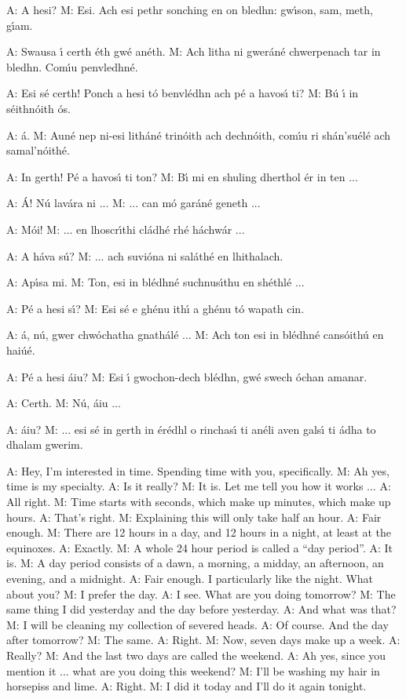 A: A hesi?
M: Esi. Ach esi pethr sonching en on bledhn: gw\'{\i}son, sam, meth, g\'{\i}am.

A: Swausa \'{\i} certh \'{e}th gw\'{e} an\'{e}th.
M: Ach litha ni gwer\'{a}n\'{e} chwerpenach tar in bledhn. Com\'{\i}u penvledhn\'{e}.

A: Esi s\'{e} certh! Ponch a hesi t\'{o} benvl\'{e}dhn ach p\'{e} a havos\'{\i} ti?
M: B\'{u} \'{\i} in s\'{e}ithn\'{o}ith \'{o}s.

A: \'{a}.
M: Aun\'{e} nep ni-esi lith\'{a}n\'{e} trin\'{o}ith ach dechn\'{o}ith, com\'{\i}u ri sh\'{a}n’su\'{e}l\'{e} ach samal’n\'{o}ith\'{e}.

A: In gerth! P\'{e} a havos\'{\i} ti ton?
M: B\'{\i} mi en shuling dherthol \'{e}r in ten ...

A: \'{A}! N\'{u} lav\'{a}ra ni ...
M: ... can m\'{o} gar\'{a}n\'{e} geneth ...

A: M\'{o}i!
M: ... en lhoscr\'{\i}thi cl\'{a}dh\'{e} rh\'{e} h\'{a}chw\'{a}r ...

A: A h\'{a}va s\'{u}?
M: ... ach suvi\'{o}na ni sal\'{a}th\'{e} en lhithalach.

A: Ap\'{\i}sa mi.
M: Ton, esi in bl\'{e}dhn\'{e} suchnus\'{\i}thu en sh\'{e}thl\'{e} ... 

A: P\'{e} a hesi s\'{\i}?
M: Esi s\'{e} e gh\'{e}nu ith\'{\i} a gh\'{e}nu t\'{o} wapath cin.

A: \'{a}, n\'{u}, gwer chw\'{o}chatha gnath\'{a}l\'{e} ...
M: Ach ton esi in bl\'{e}dhn\'{e} cans\'{o}ith\'{u} en hai\'{u}\'{e}.

A: P\'{e} a hesi \'{a}iu?
M: Esi \'{\i} gwochon-dech bl\'{e}dhn, gw\'{e} swech \'{o}chan amanar.

A: Certh.
M: N\'{u}, \'{a}iu ...

A: \'{a}iu?
M: ... esi s\'{e} in gerth in \'{e}r\'{e}dhl o rinchas\'{\i} ti an\'{e}li aven gals\'{\i} ti \'{a}dha to dhalam gwerim.

A: Hey, I’m interested in time. Spending time with you, specifically. 
M: Ah yes, time is my specialty.
A: Is it really?
M: It is. Let me tell you how it works ...
A: All right.
M: Time starts with seconds, which make up minutes, which make up hours.
A: That’s right.
M: Explaining this will only take half an hour.
A: Fair enough.
M: There are 12 hours in a day, and 12 hours in a night, at least at the equinoxes.
A: Exactly.
M: A whole 24 hour period is called a “day period”.
A: It is.
M: A day period consists of a dawn, a morning, a midday, an afternoon, an evening, and a midnight.
A: Fair enough. I particularly like the night. What about you?
M: I prefer the day.
A: I see. What are you doing tomorrow?
M: The same thing I did yesterday and the day before yesterday.
A: And what was that?
M: I will be cleaning my collection of severed heads.
A: Of course. And the day after tomorrow?
M: The same.
A: Right.
M: Now, seven days make up a week.
A: Really?
M: And the last two days are called the weekend.
A: Ah yes, since you mention it ... what are you doing this weekend?
M: I’ll be washing my hair in horsepiss and lime.
A: Right.
M: I did it today and I’ll do it again tonight.

